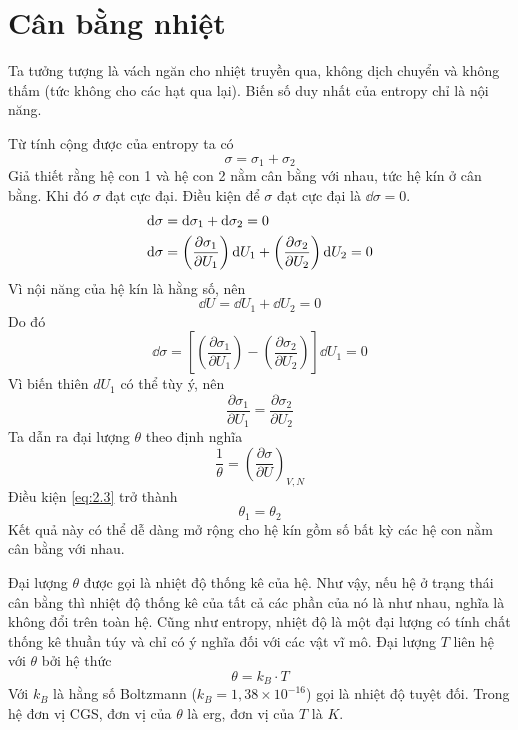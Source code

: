 \section{Cân bằng nhiệt}
	Ta tưởng tượng là vách ngăn cho nhiệt truyền qua, không dịch chuyển và không thấm (tức không cho các hạt qua lại). Biến số duy nhất của entropy chỉ là nội năng.
	
	Từ tính cộng được của entropy ta có
	\begin{equation*}
		\sigma = \sigma_1 + \sigma_2
	\end{equation*}
	Giả thiết rằng hệ con 1 và hệ con 2 nằm cân bằng với nhau, tức hệ kín ở cân bằng. Khi đó $ \sigma $ đạt cực đại. Điều kiện để $ \sigma $ đạt cực đại là $ \dd{\sigma} = 0 $.
	\begin{align}
		\mathrm{d}\sigma & = \mathrm{d}\sigma_1 + \mathrm{d}\sigma_2 = 0 \notag \\
		\mathrm{d}\sigma & = \left(\dfrac{\partial \sigma_1}{\partial U_1}\right) \mathrm{d}U_1 + \left(\dfrac{\partial \sigma_2}{\partial U_2}\right) \mathrm{d}U_2 = 0
	\end{align}
	Vì nội năng của hệ kín là hằng số, nên
	\begin{equation*}
		\dd{U} = \dd{U_1} + \dd{U_2} = 0
	\end{equation*}
	Do đó
	\begin{equation*}
		\dd{\sigma} = \left[\left(\dfrac{\partial \sigma_1}{\partial U_1}\right) - \left(\dfrac{\partial \sigma_2}{\partial U_2}\right)\right] \dd{U_1} = 0
	\end{equation*}
	Vì biến thiên $ dU_1 $ có thể tùy ý, nên
	\begin{equation}\label{eq:2.3}
		\dfrac{\partial \sigma_1}{\partial U_1} = \dfrac{\partial \sigma_2}{\partial U_2}
	\end{equation}
	Ta dẫn ra đại lượng $ \theta $ theo định nghĩa
	\begin{equation}\label{eq:2.4}
		\dfrac{1}{\theta} = \left(\dfrac{\partial \sigma}{\partial U}\right)_{V, N}
	\end{equation}
	Điều kiện \eqref{eq:2.3} trở thành
	\begin{equation}\label{eq:2.5}
		\theta_1 = \theta_2
	\end{equation}
	Kết quả này có thể dễ dàng mở rộng cho hệ kín gồm số bất kỳ các hệ con nằm cân bằng với nhau.
	
	Đại lượng $ \theta $ được gọi là nhiệt độ thống kê của hệ. Như vậy, nếu hệ ở trạng thái cân bằng thì nhiệt độ thống kê của tất cả các phần của nó là như nhau, nghĩa là không đổi trên toàn hệ. Cũng như entropy, nhiệt độ là một đại lượng có tính chất thống kê thuần túy và chỉ có ý nghĩa đối với các vật vĩ mô. Đại lượng $ T $ liên hệ với $ \theta $ bởi hệ thức
	\begin{equation}\label{eq:2.6}
		\theta = k_B \cdot T
	\end{equation}
	Với $ k_B $ là hằng số Boltzmann ($ k_B = 1,38 \times 10^{-16} $) gọi là nhiệt độ tuyệt đối. Trong hệ đơn vị CGS, đơn vị của $ \theta $ là erg, đơn vị của $ T $ là $ K $.
	
